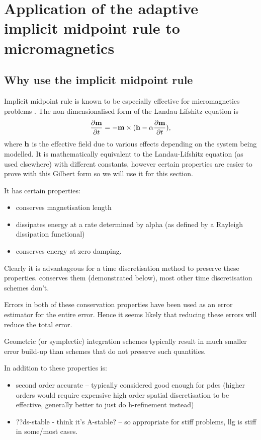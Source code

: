 \section{Application of the adaptive implicit midpoint rule to micromagnetics}


\subsection{Why use the implicit midpoint rule}

Implicit midpoint rule is known to be especially effective for micromagnetics problems \cite{DAquino2005}.
The non-dimensionalised form of the Landau-Lifshitz equation is
\begin{equation}
  \label{eq:llg-prop-form}
  \frac{\partial \mathbf{m}}{\partial t} = - \mathbf{m} \times( \mathbf{h} - \alpha \frac{\partial \mathbf{m}}{\partial t}),
\end{equation}
where $\mathbf{h}$ is the effective field due to various effects depending on the system being modelled.
It is mathematically equivalent to the Landau-Lifshitz equation (as used elsewhere) with different constants, however certain properties are easier to prove with this Gilbert form so we will use it for this section.

It has certain properties:
\begin{itemize}
\item conserves magnetisation length
\item dissipates energy at a rate determined by alpha (as defined by a Rayleigh dissipation functional)
\item conserves energy at zero damping.
\end{itemize}

Clearly it is advantageous for a time discretisation method to preserve these properties.
\imr conserves them (demonstrated below), most other time discretisation schemes don't.

Errors in both of these conservation properties have been used as an error estimator for the entire error.
Hence it seems likely that reducing these errors will reduce the total error.

Geometric (or symplectic) integration schemes typically result in much smaller error build-up than schemes that do not preserve such quantities.


In addition to these properties \imr is:
\begin{itemize}
\item second order accurate -- typically considered good enough for pdes (higher orders would require expensive high order spatial discretisation to be effective, generally better to just do h-refinement instead) \cite{Matthias}
\item ??ds-stable - think it's A-stable? \cite{??ds} -- so appropriate for stiff problems, llg is stiff in some/most cases\cite{??ds}.
\end{itemize}

